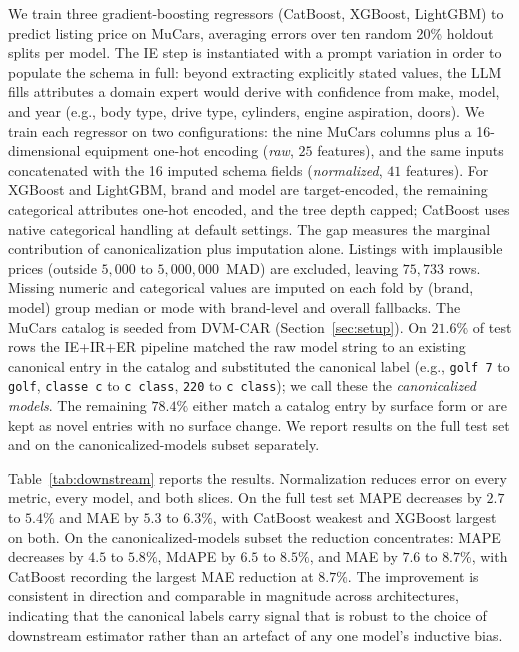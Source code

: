 \documentclass[conference]{IEEEtran}
\begin{document}
We train three gradient-boosting regressors (CatBoost,
XGBoost, LightGBM) to predict listing price on MuCars,
averaging errors over ten random 20\% holdout splits per
model. The IE step is instantiated with a prompt variation
in order to populate the schema in full: beyond extracting
explicitly stated values, the LLM fills attributes a domain
expert would derive with confidence from make, model, and
year (e.g., body type, drive type, cylinders, engine
aspiration, doors). We train each regressor on two
configurations: the nine MuCars columns plus a 16-dimensional
equipment one-hot encoding (\textit{raw}, $25$ features), and
the same inputs concatenated with the 16 imputed schema
fields (\textit{normalized}, $41$ features). For XGBoost and LightGBM, brand and model are
target-encoded, the remaining categorical attributes one-hot
encoded, and the tree depth capped; CatBoost uses native
categorical handling at default settings. The gap measures
the marginal contribution of canonicalization plus imputation
alone. Listings with
implausible prices (outside $5{,}000$ to $5{,}000{,}000$~MAD)
are excluded, leaving $75{,}733$ rows. Missing numeric and
categorical values are imputed on each fold by (brand, model)
group median or mode with brand-level and overall fallbacks.
The MuCars catalog is seeded from DVM-CAR
(Section~\ref{sec:setup}). On $21.6\%$ of test rows the IE+IR+ER
pipeline matched the raw model string to an existing canonical
entry in the catalog and substituted the canonical label (e.g.,
\texttt{golf 7} to \texttt{golf}, \texttt{classe c} to
\texttt{c class}, \texttt{220} to \texttt{c class}); we call
these the \textit{canonicalized models}. The remaining $78.4\%$ either match a
catalog entry by surface form or are kept as novel entries with
no surface change. We report results on the full test set and
on the canonicalized-models subset separately.

Table~\ref{tab:downstream} reports the results. Normalization
reduces error on every metric, every model, and both slices.
On the full test set MAPE decreases by $2.7$ to $5.4\%$
and MAE by $5.3$ to $6.3\%$, with CatBoost weakest and
XGBoost largest on both. On the
canonicalized-models subset the reduction concentrates: MAPE decreases
by $4.5$ to $5.8\%$, MdAPE by $6.5$ to $8.5\%$, and MAE by
$7.6$ to $8.7\%$, with CatBoost recording the largest MAE
reduction at $8.7\%$. The
improvement is consistent in direction and comparable in
magnitude across architectures, indicating that the canonical
labels carry signal that is robust to the choice of downstream
estimator rather than an artefact of any one model's inductive
bias.
\end{document}
